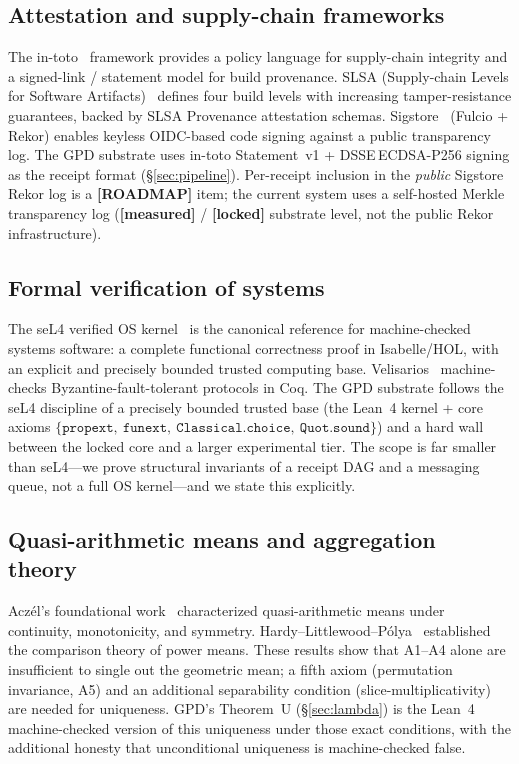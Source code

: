 \documentclass[11pt,letterpaper]{article}
\theoremstyle{definition}
\newcommand{\kernelaxioms}%
  {\{\texttt{propext},\allowbreak\ \texttt{funext},\allowbreak\ \texttt{Classical.choice},\allowbreak\ \texttt{Quot.sound}\}}
\newcommand{\locked}{\textbf{[locked]}}
\newcommand{\measured}{\textbf{[measured]}}
\newcommand{\roadmap}{\textbf{[ROADMAP]}}
\begin{document}
\subsection{Attestation and supply-chain frameworks}

The in-toto~\cite{intoto} framework provides a policy language for supply-chain
integrity and a signed-link / statement model for build provenance.  SLSA
(Supply-chain Levels for Software Artifacts)~\cite{slsa} defines four build levels
with increasing tamper-resistance guarantees, backed by SLSA Provenance attestation
schemas.  Sigstore~\cite{sigstore} (Fulcio + Rekor) enables keyless OIDC-based
code signing against a public transparency log.  The GPD substrate uses in-toto
Statement~v1 + DSSE\,ECDSA-P256 signing as the receipt format
(\S\ref{sec:pipeline}).  Per-receipt inclusion in the \emph{public} Sigstore
Rekor log is a \roadmap{} item; the current system uses a self-hosted Merkle
transparency log (\measured{} / \locked{} substrate level, not the public Rekor
infrastructure).

\subsection{Formal verification of systems}

The seL4 verified OS kernel~\cite{klein2009sel4} is the canonical reference for
machine-checked systems software: a complete functional correctness proof in
Isabelle/HOL, with an explicit and precisely bounded trusted computing base.
Velisarios~\cite{rahli2018velisarios} machine-checks Byzantine-fault-tolerant
protocols in Coq.  The GPD substrate follows the seL4 discipline of a precisely
bounded trusted base (the Lean~4 kernel + core axioms $\kernelaxioms$) and a
hard wall between the locked core and a larger experimental tier.  The scope is
far smaller than seL4---we prove structural invariants of a receipt DAG and a
messaging queue, not a full OS kernel---and we state this explicitly.

\subsection{Quasi-arithmetic means and aggregation theory}

Acz\'el's foundational work~\cite{aczel1966,aczel1948} characterized
quasi-arithmetic means under continuity, monotonicity, and symmetry.
Hardy--Littlewood--P\'olya~\cite{hardy1934} established the comparison theory of
power means.  These results show that A1--A4 alone are insufficient to single
out the geometric mean; a fifth axiom (permutation invariance, A5) and an
additional separability condition (slice-multiplicativity) are needed for
uniqueness.  GPD's Theorem~U (\S\ref{sec:lambda}) is the Lean~4 machine-checked
version of this uniqueness under those exact conditions, with the additional
honesty that unconditional uniqueness is machine-checked false.
\end{document}
